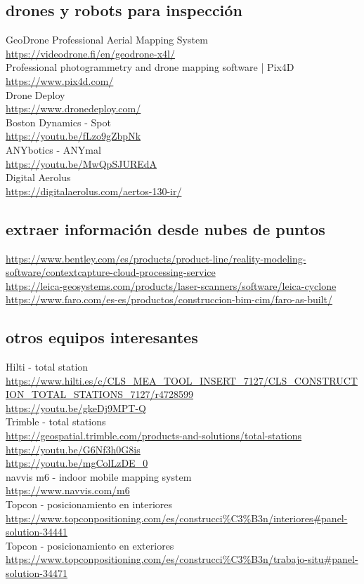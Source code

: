 \documentclass[spanish,12pt,a4paper,final,oneside]{book}
\begin{document}
\subsection{drones y robots para inspección}
GeoDrone Professional Aerial Mapping System \\ \url{https://videodrone.fi/en/geodrone-x4l/}
\\Professional photogrammetry and drone mapping software | Pix4D \\ \url{https://www.pix4d.com/}
\\Drone Deploy \\ \url{https://www.dronedeploy.com/}
\\Boston Dynamics - Spot \\ \url{https://youtu.be/fLzo9gZbpNk}
\\ANYbotics - ANYmal \\ \url{https://youtu.be/MwQpSJUREdA}
\\Digital Aerolus \\ \url{https://digitalaerolus.com/aertos-130-ir/}

\subsection{extraer información desde nubes de puntos}
\url{https://www.bentley.com/es/products/product-line/reality-modeling-software/contextcapture-cloud-processing-service}
\\ \url{https://leica-geosystems.com/products/laser-scanners/software/leica-cyclone}
\\ \url{https://www.faro.com/es-es/productos/construccion-bim-cim/faro-as-built/}

\subsection{otros equipos interesantes}
Hilti - total station \\ \url{https://www.hilti.es/c/CLS_MEA_TOOL_INSERT_7127/CLS_CONSTRUCTION_TOTAL_STATIONS_7127/r4728599} \\ \url{https://youtu.be/gkeDj9MPT-Q} 
\\ Trimble - total stations \\ \url{https://geospatial.trimble.com/products-and-solutions/total-stations} \\ \url{https://youtu.be/G6Nf3h0G8is} \\ \url{https://youtu.be/mgColLzDE_0}
\\ navvis m6 - indoor mobile mapping system \\ \url{https://www.navvis.com/m6}
\\ Topcon - posicionamiento en interiores \\ \url{https://www.topconpositioning.com/es/construcci%C3%B3n/interiores#panel-solution-34441}
\\ Topcon - posicionamiento en exteriores \\ \url{https://www.topconpositioning.com/es/construcci%C3%B3n/trabajo-situ#panel-solution-34471}
\end{document}
